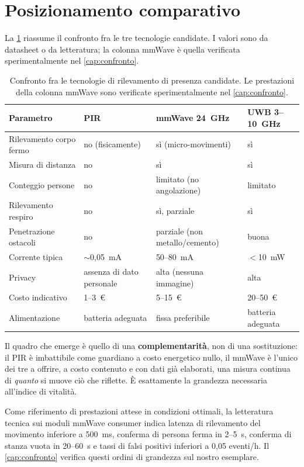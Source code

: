 \section{Posizionamento comparativo}
\label{sec:posizionamento}

La \cref{tab:comparativa} riassume il confronto fra le tre tecnologie candidate. I
valori sono da datasheet o da letteratura; la colonna mmWave è quella verificata
sperimentalmente nel \cref{cap:confronto}.

\begin{table}[htbp]
\centering
\caption{Confronto fra le tecnologie di rilevamento di presenza candidate. Le
prestazioni della colonna mmWave sono verificate sperimentalmente nel
\cref{cap:confronto}.}
\label{tab:comparativa}
\small
\begin{tabularx}{\textwidth}{@{}lXXX@{}}
\toprule
\textbf{Parametro} & \textbf{PIR} & \textbf{mmWave 24~GHz} & \textbf{UWB 3--10~GHz} \\
\midrule
Rilevamento corpo fermo & no (fisicamente) & sì (micro-movimenti) & sì \\
Misura di distanza & no & sì & sì \\
Conteggio persone & no & limitato (no angolazione) & limitato \\
Rilevamento respiro & no & sì, parziale & sì \\
Penetrazione ostacoli & no & parziale (non metallo/cemento) & buona \\
Corrente tipica & $\sim$0,05~mA & 50--80~mA & $<$10~mW \\
Privacy & assenza di dato personale & alta (nessuna immagine) & alta \\
Costo indicativo & 1--3~\euro & 5--15~\euro & 20--50~\euro \\
Alimentazione & batteria adeguata & fissa preferibile & batteria adeguata \\
\bottomrule
\end{tabularx}
\end{table}

Il quadro che emerge è quello di una \textbf{complementarità}, non di una
sostituzione: il PIR è imbattibile come guardiano a costo energetico nullo, il
mmWave è l'unico dei tre a offrire, a costo contenuto e con dati già elaborati,
una misura continua di \emph{quanto} si muove ciò che riflette. È esattamente la
grandezza necessaria all'indice di vitalità.

\medskip
\noindent
Come riferimento di prestazioni attese in condizioni ottimali, la letteratura
tecnica sui moduli mmWave consumer indica latenza di rilevamento del movimento
inferiore a 500~ms, conferma di persona ferma in 2--5~s, conferma di stanza vuota
in 20--60~s e tassi di falsi positivi inferiori a 0,05 eventi/h.
Il \cref{cap:confronto} verifica questi ordini di grandezza sul nostro esemplare.
